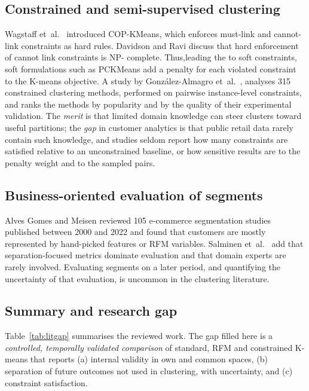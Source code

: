 \documentclass[conference,10pt]{IEEEtran}
\begin{document}
\subsection{Constrained and semi-supervised clustering}
Wagstaff et~al.\ \cite{wagstaff2001constrained} introduced COP-KMeans, which
enforces must-link and cannot-link constraints as hard rules. Davidson and
Ravi \cite{davidson2005clustering} discuss that hard enforcement of cannot link constraints is NP- complete. Thus,leading the to soft constraints, soft
formulations such as PCKMeans \cite{basu2004probabilistic} add a penalty for
each violated constraint to the K-means objective. A study by Gonz\'alez-Almagro et~al.\ \cite{gonzalez2025semi}, analyses
315 constrained clustering methods, performed on pairwise instance-level
constraints, and ranks the methods by popularity and by the quality of their
experimental validation. The \emph{merit} is that
limited domain knowledge can steer clusters toward useful partitions; the
\emph{gap} in customer analytics is that public retail data rarely contain
such knowledge, and studies seldom report how many constraints are satisfied
relative to an unconstrained baseline, or how sensitive results are to the
penalty weight and to the sampled pairs.

\subsection{Business-oriented evaluation of segments}
Alves Gomes and Meisen \cite{gomes2023review} reviewed 105 e-commerce
segmentation studies published between 2000 and 2022 and found that customers
are mostly represented by hand-picked features or RFM variables. Salminen
et~al.\ \cite{salminen2023algorithms} add that separation-focused metrics
dominate evaluation and that domain experts are rarely involved.
Evaluating segments on a later period, and quantifying the uncertainty of
that evaluation, is uncommon in the clustering literature.

\subsection{Summary and research gap}
Table~\ref{tab:litgap} summarises the reviewed work. The gap filled here is a
\emph{controlled, temporally validated comparison} of standard, RFM and
constrained K-means that reports (a) internal validity in own and common
spaces, (b) separation of future outcomes not used in clustering, with
uncertainty, and (c) constraint satisfaction. 
\end{document}
